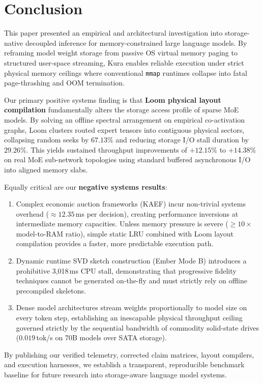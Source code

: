 \section{Conclusion}
\label{sec:conclusion}

This paper presented an empirical and architectural investigation into storage-native decoupled inference for memory-constrained large language models. By reframing model weight storage from passive OS virtual memory paging to structured user-space streaming, Kura enables reliable execution under strict physical memory ceilings where conventional \texttt{mmap} runtimes collapse into fatal page-thrashing and OOM termination.

Our primary positive systems finding is that \textbf{Loom physical layout compilation} fundamentally alters the storage access profile of sparse MoE models. By solving an offline spectral arrangement on empirical co-activation graphs, Loom clusters routed expert tensors into contiguous physical sectors, collapsing random seeks by $67.13\%$ and reducing storage I/O stall duration by $29.26\%$. This yields sustained throughput improvements of $+12.15\%$ to $+14.38\%$ on real MoE sub-network topologies using standard buffered asynchronous I/O into aligned memory slabs.

Equally critical are our \textbf{negative systems results}:
\begin{enumerate}
    \item Complex economic auction frameworks (KAEF) incur non-trivial systems overhead ($\approx 12.35$\,ms per decision), creating performance inversions at intermediate memory capacities. Unless memory pressure is severe ($\ge 10\times$ model-to-RAM ratio), simple static LRU combined with Loom layout compilation provides a faster, more predictable execution path.
    \item Dynamic runtime SVD sketch construction (Ember Mode B) introduces a prohibitive 3,018\,ms CPU stall, demonstrating that progressive fidelity techniques cannot be generated on-the-fly and must strictly rely on offline precompiled skeletons.
    \item Dense model architectures stream weights proportionally to model size on every token step, establishing an inescapable physical throughput ceiling governed strictly by the sequential bandwidth of commodity solid-state drives ($0.019$\,tok/s on 70B models over SATA storage).
\end{enumerate}

By publishing our verified telemetry, corrected claim matrices, layout compilers, and execution harnesses, we establish a transparent, reproducible benchmark baseline for future research into storage-aware language model systems.
